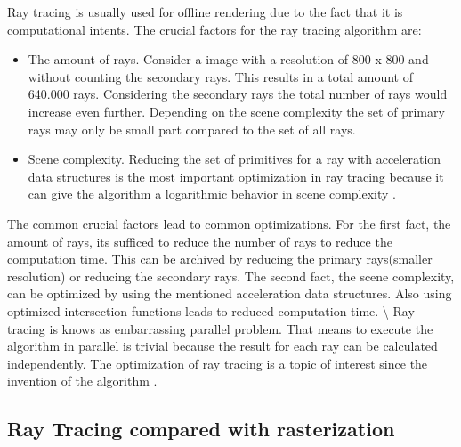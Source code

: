 Ray tracing is usually used for offline rendering due to the fact that
it is computational intents. The crucial factors for the ray tracing
algorithm are:

\begin{itemize}
\item
  The amount of rays. Consider a image with a resolution of 800 x 800
  and without counting the secondary rays. This results in a total
  amount of 640.000 rays. Considering the secondary rays the total
  number of rays would increase even further. Depending on the scene
  complexity the set of primary rays may only be small part compared to
  the set of all rays.
\item
  Scene complexity. Reducing the set of primitives for a ray with
  acceleration data structures is the most important optimization in ray
  tracing because it can give the algorithm a logarithmic behavior in
  scene complexity \cite{copy}.
\end{itemize}

The common crucial factors lead to common optimizations. For the first
fact, the amount of rays, its sufficed to reduce the number of rays to
reduce the computation time. This can be archived by reducing the
primary rays(smaller resolution) or reducing the secondary rays. The
second fact, the scene complexity, can be optimized by using the
mentioned acceleration data structures. Also using optimized
intersection functions leads to reduced computation time.
\textbackslash{} Ray tracing is knows as embarrassing parallel problem.
That means to execute the algorithm in parallel is trivial because the
result for each ray can be calculated independently. The optimization of
ray tracing is a topic of interest since the invention of the algorithm
\cite{copy}.

\subsection{Ray Tracing compared with
rasterization}\label{ray-tracing-compared-with-rasterization}

